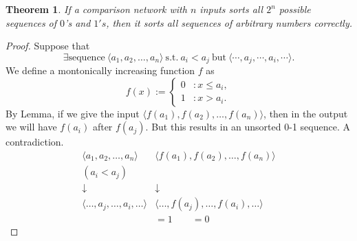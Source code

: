\documentclass[12pt,openany]{book}
\newtheorem{theorem}{Theorem}[chapter]
\theoremstyle{definition}
\newtheorem{example}{Example}[chapter]
\begin{document}
\newpage
	\begin{tcolorbox}[colframe=thmcolor,title={\color{white}\bf Zero-One Principle}]
		\begin{theorem}
			If a comparison network with \(n\) inputs sorts all \(2^n\) possible sequences of \(0\)'s and \(1's\), then it sorts all sequences of arbitrary numbers correctly.
		\end{theorem}
	\end{tcolorbox}
	\begin{proof}
		Suppose that \[
		\exists\text{sequence}\ \langle a_1,a_2,\dots,a_n\rangle\ \text{s.t.}\ a_i<a_j\ \text{but}\ \langle \cdots,a_j,\cdots,a_i,\cdots\rangle.
		\] We define a montonically increasing function \(f\) as \[
		f(x):=\begin{cases}
			0&:x\leq a_i,\\
			1&:x> a_i.
		\end{cases}
		\] By Lemma, if we give the input \( \langle f(a_1), f(a_2), \ldots, f(a_n) \rangle \),
		then in the output we will have \( f(a_i) \) after \( f(a_j) \).
		But this results in an unsorted 0-1 sequence. A contradiction.	\[
		\begin{array}{cccc}
			\langle a_1, a_2, \ldots, a_n \rangle & \langle f(a_1), f(a_2), \ldots, f(a_n) \rangle \\
			(a_i < a_j) & \\
			\downarrow & \downarrow \\
			\langle \ldots, a_j, \ldots, a_i, \ldots \rangle & \langle \ldots, f(a_j), \ldots, f(a_i), \ldots \rangle \\
			& =1 \quad \quad =0
		\end{array}
		\]
	\end{proof}
\end{document}
